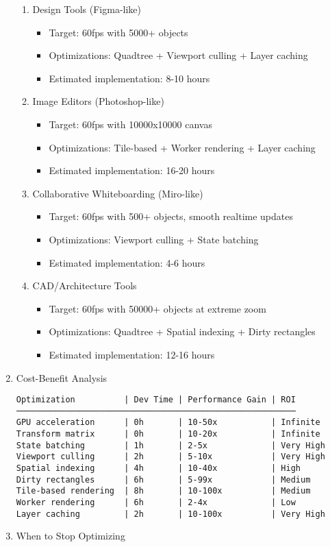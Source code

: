 \documentclass[11pt]{article}
\begin{document}
\begin{enumerate}
\begin{enumerate}
\item Design Tools (Figma-like)
\label{sec:org1a2dbb5}
\begin{itemize}
\item Target: 60fps with 5000+ objects
\item Optimizations: Quadtree + Viewport culling + Layer caching
\item Estimated implementation: 8-10 hours
\end{itemize}
\item Image Editors (Photoshop-like)
\label{sec:org3eae565}
\begin{itemize}
\item Target: 60fps with 10000x10000 canvas
\item Optimizations: Tile-based + Worker rendering + Layer caching
\item Estimated implementation: 16-20 hours
\end{itemize}
\item Collaborative Whiteboarding (Miro-like)
\label{sec:org6480d4c}
\begin{itemize}
\item Target: 60fps with 500+ objects, smooth realtime updates
\item Optimizations: Viewport culling + State batching
\item Estimated implementation: 4-6 hours
\end{itemize}
\item CAD/Architecture Tools
\label{sec:orgcc97b06}
\begin{itemize}
\item Target: 60fps with 50000+ objects at extreme zoom
\item Optimizations: Quadtree + Spatial indexing + Dirty rectangles
\item Estimated implementation: 12-16 hours
\end{itemize}
\end{enumerate}
\item Cost-Benefit Analysis
\label{sec:org9e4e7fc}

\begin{verbatim}
Optimization          | Dev Time | Performance Gain | ROI
─────────────────────────────────────────────────────────
GPU acceleration      | 0h       | 10-50x           | Infinite
Transform matrix      | 0h       | 10-20x           | Infinite
State batching        | 1h       | 2-5x             | Very High
Viewport culling      | 2h       | 5-10x            | Very High
Spatial indexing      | 4h       | 10-40x           | High
Dirty rectangles      | 6h       | 5-99x            | Medium
Tile-based rendering  | 8h       | 10-100x          | Medium
Worker rendering      | 6h       | 2-4x             | Low
Layer caching         | 2h       | 10-100x          | Very High
\end{verbatim}
\item When to Stop Optimizing
\label{sec:org58b7c37}


\end{enumerate}
\end{document}
